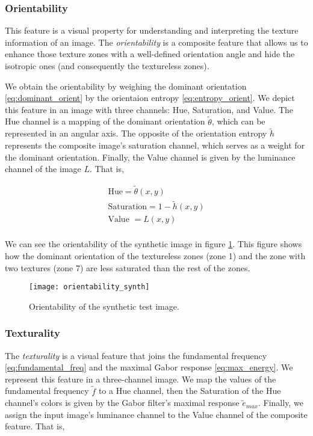 \subsubsection{Orientability}
This feature is a visual property for understanding and interpreting the texture information of an image. The \textit{orientability} is a composite feature that allows us to enhance those texture zones with a well-defined orientation angle and hide the isotropic ones (and consequently the textureless zones).

We obtain the orientability by weighing the dominant orientation \eqref{eq:dominant_orient} by the orientaion entropy \eqref{eq:entropy_orient}. We depict this feature in an image with three channels: Hue, Saturation, and Value. The Hue channel is a mapping of the dominant orientation $\widetilde{\theta}$, which can be represented in an angular axis. The opposite of the orientation entropy $\widetilde{h}$ represents the composite image's saturation channel, which serves as a weight for the dominant orientation. Finally, the Value channel is given by the luminance channel of the image $L$. That is,

\begin{gather}
    \text{Hue} = \widetilde{\theta}(x,y) \\
    \text{Saturation} = 1 - \widetilde{h}(x,y) \\
    \text{Value }= L(x,y) \\
\end{gather}

We can see the orientability of the synthetic image in figure \ref{fig:orientability_synth}. This figure shows how the dominant orientation of the textureless zones (zone 1) and the zone with two textures (zone 7) are less saturated than the rest of the zones. 

\begin{figure}[!ht]
	\texttt{[image: orientability\_synth]}
    \caption{Orientability of the synthetic test image.}
    \label{fig:orientability_synth}
\end{figure}

\subsubsection{Texturality}
The \textit{texturality} is a visual feature that joins the fundamental frequency \eqref{eq:fundamental_freq} and the maximal Gabor response \eqref{eq:max_energy}. We represent this feature in a three-channel image. We map the values of the fundamental frequency $\widetilde{f}$ to a Hue channel, then the Saturation of the Hue channel's colors is given by the Gabor filter's maximal response $\widetilde{e}_{max}$. Finally, we assign the input image's luminance channel to the Value channel of the composite feature. That is,

